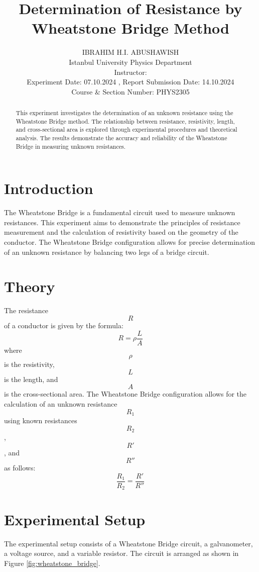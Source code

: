 \documentclass[journal]{IEEEtran}
\begin{document}
\title{Determination of Resistance by Wheatstone Bridge Method}
\author{IBRAHIM H.I. ABUSHAWISH\\
Istanbul University Physics Department\\
Instructor: \hspace{10px} \\
Experiment Date: 07.10.2024 , Report Submission Date: 14.10.2024\\
Course \& Section Number: PHYS2305}

\maketitle

\begin{abstract}
    This experiment investigates the determination of an unknown resistance using the Wheatstone Bridge method. The relationship between resistance, resistivity, length, and cross-sectional area is explored through experimental procedures and theoretical analysis. The results demonstrate the accuracy and reliability of the Wheatstone Bridge in measuring unknown resistances.
\end{abstract}

\section{Introduction}
The Wheatstone Bridge is a fundamental circuit used to measure unknown resistances. This experiment aims to demonstrate the principles of resistance measurement and the calculation of resistivity based on the geometry of the conductor. The Wheatstone Bridge configuration allows for precise determination of an unknown resistance by balancing two legs of a bridge circuit.

\section{Theory}
The resistance $$ R $$ of a conductor is given by the formula:
$$
R = \rho \frac{L}{A}
$$
where $$ \rho $$ is the resistivity, $$ L $$ is the length, and $$ A $$ is the cross-sectional area. The Wheatstone Bridge configuration allows for the calculation of an unknown resistance $$ R_1 $$ using known resistances $$ R_2 $$, $$ R' $$, and $$ R'' $$ as follows:
$$
\frac{R_1}{R_2} = \frac{R'}{R''}
$$

\section{Experimental Setup}
The experimental setup consists of a Wheatstone Bridge circuit, a galvanometer, a voltage source, and a variable resistor. The circuit is arranged as shown in Figure \ref{fig:wheatstone_bridge}.
\end{document}
